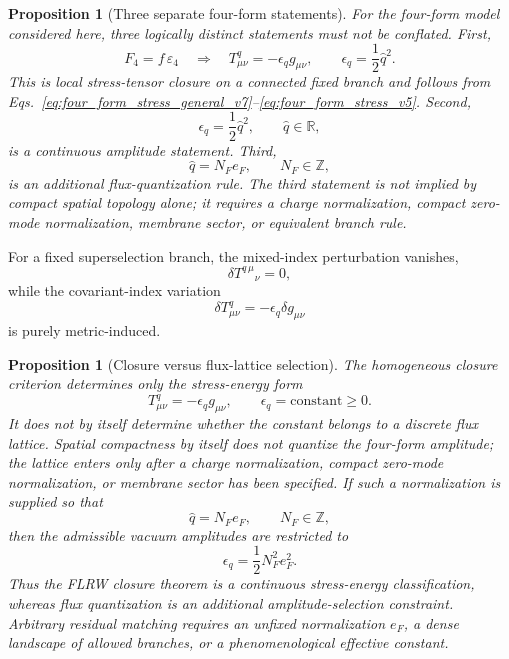 \documentclass[
  aps,
  prd,
  reprint,
  superscriptaddress,
  floatfix,
  nofootinbib,
  longbibliography
]{revtex4-2}
\theoremstyle{plain}
\newtheorem{proposition}[theorem]{Proposition}
\theoremstyle{definition}
\theoremstyle{remark}
\newcommand{\Z}{\mathbb Z}
\newcommand{\R}{\mathbb R}
\newcommand{\eps}{\epsilon}
\newcommand{\qhat}{\widehat q}
\newcommand{\NF}{N_F}
\newcommand{\eF}{e_F}
\begin{document}
\begin{proposition}[Three separate four-form statements]
\textup{For the four-form model considered here, three logically distinct statements must not be conflated.}
First,
\begin{equation}
F_4=f\,\varepsilon_4
\quad\Rightarrow\quad
T^q_{\mu\nu}=-\eps_q g_{\mu\nu},
\qquad
\eps_q=\frac12\qhat^2 .
\label{eq:four_form_local_branch_v23}
\end{equation}
This is local stress-tensor closure on a connected fixed branch and follows from
Eqs.~\eqref{eq:four_form_stress_general_v7}--\eqref{eq:four_form_stress_v5}.
Second,
\begin{equation}
\eps_q=\frac12\qhat^2,
\qquad
\qhat\in\R,
\label{eq:four_form_continuous_branch_v23}
\end{equation}
is a continuous amplitude statement.  Third,
\begin{equation}
\qhat=\NF\eF,
\qquad
\NF\in\Z,
\label{eq:four_form_quantization_rule_v23}
\end{equation}
is an additional flux-quantization rule.  The third statement is not implied by
compact spatial topology alone; it requires a charge normalization, compact
zero-mode normalization, membrane sector, or equivalent branch rule.
\end{proposition}
For a fixed superselection branch, the mixed-index perturbation vanishes,
\begin{equation}
\delta T^{q\,\mu}{}_{\nu}=0,
\label{eq:mixed_index_four_form_v5}
\end{equation}
while the covariant-index variation
\begin{equation}
\delta T^q_{\mu\nu}=-\eps_q\delta g_{\mu\nu}
\label{eq:covariant_four_form_v5}
\end{equation}
is purely metric-induced.

\begin{proposition}[Closure versus flux-lattice selection]
The homogeneous closure criterion determines only the stress-energy form
\begin{equation}
T^q_{\mu\nu}=-\eps_q g_{\mu\nu},
\qquad
\eps_q=\text{constant}\ge0 .
\end{equation}
It does not by itself determine whether the constant belongs to a discrete flux
lattice.  Spatial compactness by itself does not quantize the four-form
amplitude; the lattice enters only after a charge normalization, compact
zero-mode normalization, or membrane sector has been specified.  If such a
normalization is supplied so that
\begin{equation}
\qhat=\NF\eF,
\qquad
\NF\in\Z,
\end{equation}
then the admissible vacuum amplitudes are restricted to
\begin{equation}
\eps_q=\frac12\NF^2\eF^2 .
\label{eq:flux_lattice_v5}
\end{equation}
Thus the FLRW closure theorem is a continuous stress-energy classification,
whereas flux quantization is an additional amplitude-selection constraint.
Arbitrary residual matching requires an unfixed normalization \(\eF\), a dense
landscape of allowed branches, or a phenomenological effective constant.
\end{proposition}
\end{document}
